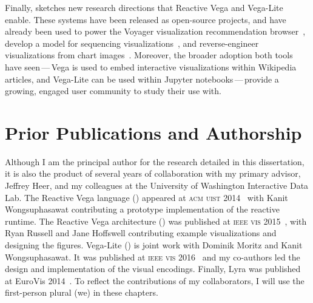 Finally,  sketches new research directions that Reactive
Vega and Vega-Lite enable. These systems have been released as open-source
projects, and have already been used to power the Voyager visualization
recommendation browser~\cite{voyager,voyager2,compassql}, develop a model for
sequencing visualizations~\cite{kim:graphscape}, and reverse-engineer
visualizations from chart images~\cite{poco:reverse}. Moreover, the broader
adoption both tools have seen\,---\,Vega is used to embed interactive
visualizations within Wikipedia articles, and Vega-Lite can be used within
Jupyter notebooks\,---\,provide a growing, engaged user community to study their
use with.

\vspace{-20pt}

\section{Prior Publications and Authorship}

\vspace{-7pt}

Although I am the principal author for the research detailed in this
dissertation, it is also the product of several years of collaboration with my
primary advisor, Jeffrey Heer, and my colleagues at the University of Washington
Interactive Data Lab. The Reactive Vega language () appeared
at \textsc{acm uist} 2014~\cite{satyanarayan:declarative} with Kanit
Wongsuphasawat contributing a prototype implementation of the reactive runtime.
The Reactive Vega architecture () was published at
\textsc{ieee vis} 2015~\cite{reactive-vega-arch}, with Ryan Russell and Jane
Hoffswell contributing example visualizations and designing the figures.
Vega-Lite () is joint work with Dominik Moritz and Kanit
Wongsuphasawat. It was published at \textsc{ieee vis} 2016~\cite{vega-lite} and
my co-authors led the design and implementation of the visual encodings.
Finally, Lyra was published at EuroVis 2014~\cite{lyra}. To reflect the
contributions of my collaborators, I will use the first-person plural (we) in
these chapters.